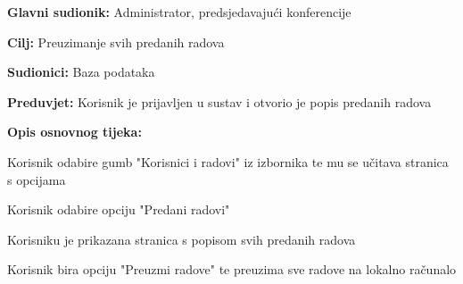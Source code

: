 					\noindent {}
					\begin{packed_item}
						\item \textbf{Glavni sudionik:} Administrator, predsjedavajući konferencije
						\item \textbf{Cilj:} Preuzimanje svih predanih radova
						\item \textbf{Sudionici:} Baza podataka
						\item \textbf{Preduvjet:} Korisnik je prijavljen u sustav i otvorio je popis predanih radova
						
						\item \textbf{Opis osnovnog tijeka:} 
						\item[] \begin{packed_enum}
							
							\item Korisnik odabire gumb "Korisnici i radovi" iz izbornika te mu se učitava stranica s opcijama
							\item Korisnik odabire opciju "Predani radovi" 
							\item Korisniku je prikazana stranica s popisom svih predanih radova
							\item Korisnik bira opciju "Preuzmi radove" te preuzima sve radove na lokalno računalo
							
							
						\end{packed_enum}
					\end{packed_item}


					\noindent {}
					
